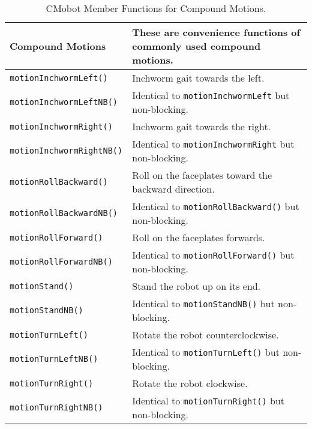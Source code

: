 \begin{table}[!h]
\begin{center}
\caption{CMobot Member Functions for Compound Motions.}
\begin{tabular}{p{38 mm}p{77 mm}}
Compound Motions & These are convenience functions of commonly used compound motions. \\
\hline
\texttt{motionInchwormLeft()} \dotfill & Inchworm gait towards the left. \\
\texttt{motionInchwormLeftNB()} \dotfill & Identical to \texttt{motionInchwormLeft} but non-blocking. \\
\texttt{motionInchwormRight()} \dotfill & Inchworm gait towards the right. \\
\texttt{motionInchwormRightNB()} \dotfill & Identical to \texttt{motionInchwormRight} but non-blocking. \\
\texttt{motionRollBackward()} \dotfill & Roll on the faceplates toward the backward direction. \\
\texttt{motionRollBackwardNB()} \dotfill & Identical to \texttt{motionRollBackward()} but non-blocking. \\
\texttt{motionRollForward()} \dotfill & Roll on the faceplates forwards. \\
\texttt{motionRollForwardNB()} \dotfill & Identical to \texttt{motionRollForward()} but non-blocking. \\
\texttt{motionStand()} \dotfill & Stand the robot up on its end. \\
\texttt{motionStandNB()} \dotfill & Identical to \texttt{motionStandNB()} but non-blocking. \\
\texttt{motionTurnLeft()} \dotfill & Rotate the robot counterclockwise. \\
\texttt{motionTurnLeftNB()} \dotfill & Identical to \texttt{motionTurnLeft()} but non-blocking. \\
\texttt{motionTurnRight()} \dotfill & Rotate the robot clockwise. \\
\texttt{motionTurnRightNB()} \dotfill & Identical to \texttt{motionTurnRight()} but non-blocking. \\
\hline
\end{tabular}
\end{center}
\label{mobilec_api_compound}
\end{table}

\clearpage
\newpage
















%






